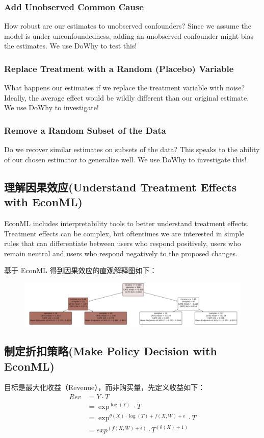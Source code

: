 \documentclass[12pt]{article}
\begin{document}
\subsubsection{Add Unobserved Common Cause}
How robust are our estimates to unobserved confounders? Since we assume the model is under unconfoundedness, adding an unobserved confounder might bias the estimates. We use DoWhy to test this!


\subsubsection{Replace Treatment with a Random (Placebo) Variable}
What happens our estimates if we replace the treatment variable with noise? Ideally, the average effect would be wildly different than our original estimate. We use DoWhy to investigate!

\subsubsection{Remove a Random Subset of the Data}
Do we recover similar estimates on subsets of the data? This speaks to the ability of our chosen estimator to generalize well. We use DoWhy to investigate this!

\subsection{理解因果效应(Understand Treatment Effects with EconML)}
EconML includes interpretability tools to better understand treatment effects. Treatment effects can be complex, but oftentimes we are interested in simple rules that can differentiate between users who respond positively, users who remain neutral and users who respond negatively to the proposed changes.

基于 EconML 得到因果效应的直观解释图如下：
\begin{figure}[H]
    \centering
    \includegraphics[width=.6\textwidth]{fig/Casual_Inference_Microsoft_Example_6.png}
\end{figure}

\subsection{制定折扣策略(Make Policy Decision with EconML)}
目标是最大化收益（Revenue），而非购买量，先定义收益如下：
\begin{align*}
Rev &= Y \cdot T \\
	&= \exp^{\log(Y)} \cdot T \\
	&= \exp^{\theta(X) \cdot \log(T) + f(X,W) + \epsilon} \cdot T \\
	&= exp^{(f(X,W) + \epsilon)} \cdot T^{(\theta(X) + 1)}
\end{align*}
\end{document}
